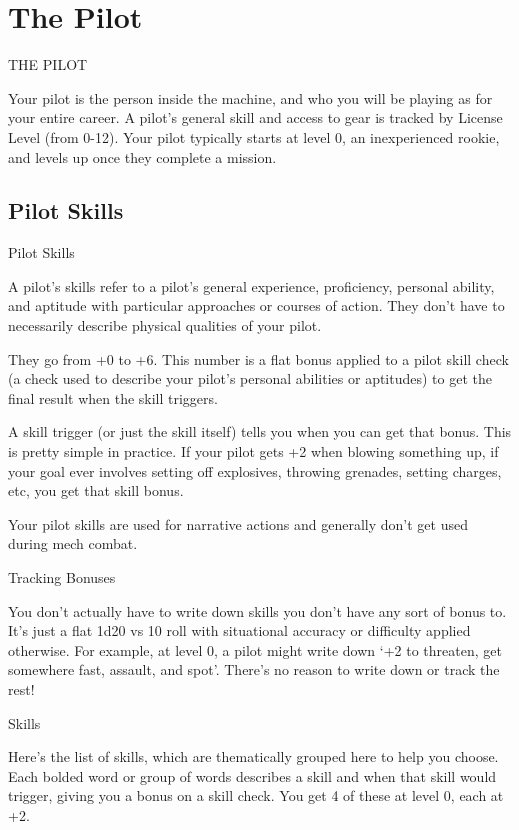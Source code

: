 \part{The Pilot}
  THE PILOT   

Your pilot is the person inside the machine, and who you will be playing as for your entire career.  
A pilot’s general skill and access to gear is tracked by License Level (from 0-12). Your pilot  
typically starts at level 0, an inexperienced rookie, and levels up once they complete a  
mission.  

                                                                                                         
\chapter{Pilot Skills}

                                                   Pilot Skills  

A pilot’s skills refer to a pilot’s general experience, proficiency, personal ability, and aptitude with  
particular approaches or courses of action. They don’t have to necessarily describe physical  
qualities of your pilot.  

They go from +0 to +6. This number is a flat bonus applied to a pilot skill check (a check used to  
describe your pilot’s personal abilities or aptitudes) to get the final result when the skill triggers.  

A skill trigger (or just the skill itself) tells you when you can get that bonus. This is pretty simple in  
practice. If your pilot gets +2 when blowing something up, if your goal ever involves setting off  
explosives, throwing grenades, setting charges, etc, you get that skill bonus.   

Your pilot skills are used for narrative actions and generally don’t get used during mech combat.  

                                                Tracking Bonuses
 

You don’t actually have to write down skills you don’t have any sort of bonus to. It’s just a flat  
1d20 vs 10 roll with situational accuracy or difficulty applied otherwise. For example, at level 0, a  
pilot might write down ‘+2 to threaten, get somewhere fast, assault, and spot’. There’s no reason  
to write down or track the rest!
 

                                                        Skills  

Here’s the list of skills, which are thematically grouped here to help you choose. Each bolded  
word or group of words describes a skill and when that skill would trigger, giving you a bonus on a  
skill check. You get 4 of these at level 0, each at +2.  

